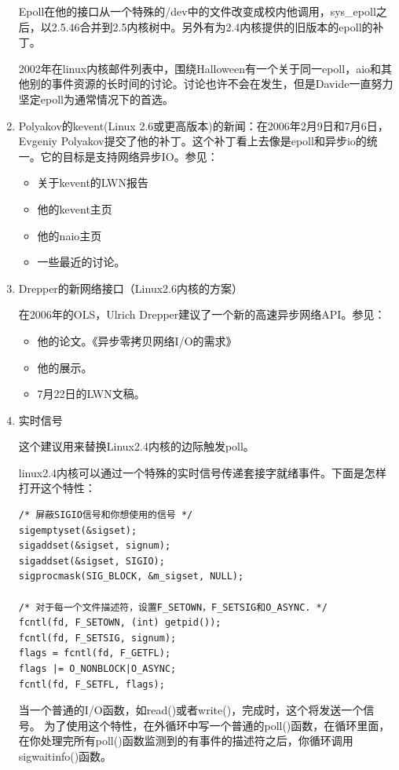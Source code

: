 \documentclass[12pt, twoside, a4paper, xetex]{report}
\begin{document}
\begin{enumerate}
	Epoll在他的接口从一个特殊的/dev中的文件改变成校内他调用，sys\_epoll之后，以2.5.46合并到2.5内核树中。另外有为2.4内核提供的旧版本的epoll的补丁。
	
	2002年在linux内核邮件列表中，围绕Halloween有一个关于同一epoll，aio和其他别的事件资源的长时间的讨论。讨论也许不会在发生，但是Davide一直努力坚定epoll为通常情况下的首选。

	\item Polyakov的kevent(Linux 2.6或更高版本)的新闻：在2006年2月9日和7月6日，Evgeniy Polyakov提交了他的补丁。这个补丁看上去像是epoll和异步io的统一。它的目标是支持网络异步IO。参见：
	\begin{itemize}
		\item 关于kevent的LWN报告
		\item 他的kevent主页
		\item 他的naio主页
		\item 一些最近的讨论。
	\end{itemize}
	
	\item Drepper的新网络接口（Linux2.6内核的方案）

		在2006年的OLS，Ulrich Drepper建议了一个新的高速异步网络API。参见：
	\begin{itemize}
		\item 他的论文。《异步零拷贝网络I/O的需求》
		\item 他的展示。
		\item 7月22日的LWN文稿。
	\end{itemize}

	\item 实时信号

		这个建议用来替换Linux2.4内核的边际触发poll。

		linux2.4内核可以通过一个特殊的实时信号传递套接字就绪事件。下面是怎样打开这个特性：

		\begin{verbatim}
/* 屏蔽SIGIO信号和你想使用的信号 */
sigemptyset(&sigset);
sigaddset(&sigset, signum);
sigaddset(&sigset, SIGIO);
sigprocmask(SIG_BLOCK, &m_sigset, NULL);

/* 对于每一个文件描述符，设置F_SETOWN，F_SETSIG和O_ASYNC. */
fcntl(fd, F_SETOWN, (int) getpid());
fcntl(fd, F_SETSIG, signum);
flags = fcntl(fd, F_GETFL);
flags |= O_NONBLOCK|O_ASYNC;
fcntl(fd, F_SETFL, flags);
		\end{verbatim}
		
		当一个普通的I/O函数，如read()或者write()，完成时，这个将发送一个信号。
为了使用这个特性，在外循环中写一个普通的poll()函数，在循环里面，在你处理完所有poll()函数监测到的有事件的描述符之后，你循环调用sigwaitinfo()函数。


\end{enumerate}
\end{document}
